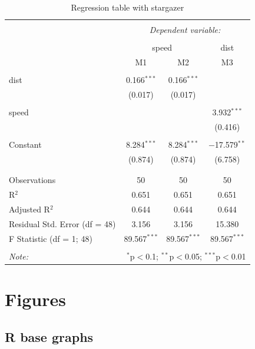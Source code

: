 \documentclass[
  12pt,
]{article}
\begin{document}
\begin{table}[H] \centering 
  \caption{Regression table with stargazer} 
  \label{tab2} 
\begin{tabular}{@{\extracolsep{5pt}}lccc} 
\\[-1.8ex]\hline 
\hline \\[-1.8ex] 
 & \multicolumn{3}{c}{\textit{Dependent variable:}} \\ 
\cline{2-4} 
\\[-1.8ex] & \multicolumn{2}{c}{speed} & dist \\ 
 & M1 & M2 & M3 \\ 
\hline \\[-1.8ex] 
 dist & 0.166$^{***}$ & 0.166$^{***}$ &  \\ 
  & (0.017) & (0.017) &  \\ 
  & & & \\ 
 speed &  &  & 3.932$^{***}$ \\ 
  &  &  & (0.416) \\ 
  & & & \\ 
 Constant & 8.284$^{***}$ & 8.284$^{***}$ & $-$17.579$^{**}$ \\ 
  & (0.874) & (0.874) & (6.758) \\ 
  & & & \\ 
\hline \\[-1.8ex] 
Observations & 50 & 50 & 50 \\ 
R$^{2}$ & 0.651 & 0.651 & 0.651 \\ 
Adjusted R$^{2}$ & 0.644 & 0.644 & 0.644 \\ 
Residual Std. Error (df = 48) & 3.156 & 3.156 & 15.380 \\ 
F Statistic (df = 1; 48) & 89.567$^{***}$ & 89.567$^{***}$ & 89.567$^{***}$ \\ 
\hline 
\hline \\[-1.8ex] 
\textit{Note:}  & \multicolumn{3}{r}{$^{*}$p$<$0.1; $^{**}$p$<$0.05; $^{***}$p$<$0.01} \\ 
\end{tabular} 
\end{table}

\hypertarget{figures}{%
\section{Figures}\label{figures}}

\hypertarget{r-base-graphs}{%
\subsection{R base graphs}\label{r-base-graphs}}
\end{document}

